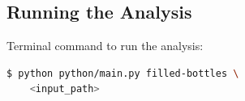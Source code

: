 \documentclass[a4paper,12pt]{article}
\begin{document}



\subsection{Running the Analysis}

Terminal command to run the analysis:

\begin{lstlisting}[language=bash]
$ python python/main.py filled-bottles \
    <input_path>
\end{lstlisting}
\end{document}
